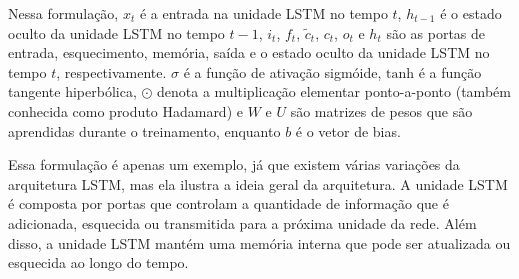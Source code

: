 Nessa formulação, $x_t$ é a entrada na unidade LSTM no tempo $t$, $h_{t-1}$ é o estado oculto da unidade LSTM no tempo $t-1$, $i_t$, $f_t$, $\tilde{c}_t$, $c_t$, $o_t$ e $h_t$ são as portas de entrada, esquecimento, memória, saída e o estado oculto da unidade LSTM no tempo $t$, respectivamente. $\sigma$ é a função de ativação sigmóide, $\text{tanh}$ é a função tangente hiperbólica, $\odot$ denota a multiplicação elementar ponto-a-ponto (também conhecida como produto Hadamard) e $W$ e $U$ são matrizes de pesos que são aprendidas durante o treinamento, enquanto $b$ é o vetor de bias.

Essa formulação é apenas um exemplo, já que existem várias variações da arquitetura LSTM, mas ela ilustra a ideia geral da arquitetura. A unidade LSTM é composta por portas que controlam a quantidade de informação que é adicionada, esquecida ou transmitida para a próxima unidade da rede. Além disso, a unidade LSTM mantém uma memória interna que pode ser atualizada ou esquecida ao longo do tempo.